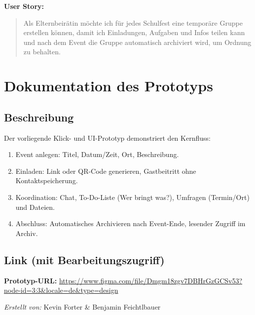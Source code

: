 \documentclass[11pt,a4paper]{article}
\begin{document}
\textbf{User Story:}
\begin{quote}
Als Elternbeirätin möchte ich für jedes Schulfest eine temporäre Gruppe erstellen können, damit ich Einladungen, Aufgaben und Infos teilen kann und nach dem Event die Gruppe automatisch archiviert wird, um Ordnung zu behalten.
\end{quote}

\section*{Dokumentation des Prototyps}
\subsection*{Beschreibung}
Der vorliegende Klick- und UI-Prototyp demonstriert den Kernfluss:
\begin{enumerate}
  \item Event anlegen: Titel, Datum/Zeit, Ort, Beschreibung.
  \item Einladen: Link oder QR-Code generieren, Gastbeitritt ohne Kontaktspeicherung.
  \item Koordination: Chat, To-Do-Liste (Wer bringt was?), Umfragen (Termin/Ort) und Dateien.
  \item Abschluss: Automatisches Archivieren nach Event-Ende, lesender Zugriff im Archiv.
\end{enumerate}

\subsection*{Link (mit Bearbeitungszugriff)}
\textbf{Prototyp-URL:}  
\url{https://www.figma.com/file/Dmgm18zgv7DBHrGzGCSv53?node-id=3:3&locale=de&type=design}

\vfill
\textit{Erstellt von:} Kevin Forter \& Benjamin Feichtlbauer
\end{document}
